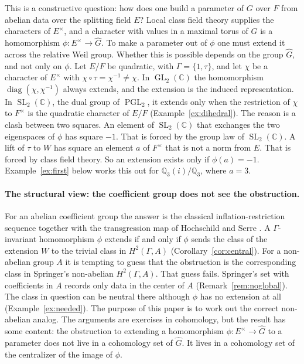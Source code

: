 \documentclass[12pt,letterpaper]{article}
\numberwithin{equation}{section}
\theoremstyle{plain}
\theoremstyle{definition}
\newcommand{\C}{\mathbb{C}}
\newcommand{\Q}{\mathbb{Q}}
\newcommand{\Gh}{\widehat{G}}
\DeclareMathOperator{\GL}{GL}
\DeclareMathOperator{\SL}{SL}
\DeclareMathOperator{\PGL}{PGL}
\DeclareMathOperator{\diag}{diag}
\begin{document}
This is a constructive question: how does one build a parameter of $G$
over $F$ from abelian data over the splitting field $E$? Local class
field theory supplies the characters of $E^\times$, and a character with
values in a maximal torus of $\Gh$ is a homomorphism
$\phi:E^\times\to\Gh$. To make a parameter out of $\phi$ one must extend
it across the relative Weil group. Whether this is possible depends on
the group $\Gh$, and not only on $\phi$. Let $E/F$ be quadratic, with
$\Gamma=\{1,\tau\}$, and let $\chi$ be a character of $E^\times$ with
$\chi\circ\tau=\chi^{-1}\neq\chi$. In $\GL_2(\C)$ the homomorphism
$\diag(\chi,\chi^{-1})$ always extends, and the extension is the induced
representation. In $\SL_2(\C)$, the dual group of $\PGL_2$, it extends
only when the restriction of $\chi$ to $F^\times$ is the quadratic
character of $E/F$ (Example~\ref{ex:dihedral}). The reason is a clash
between two squares. An element of $\SL_2(\C)$ that exchanges the two
eigenspaces of $\phi$ has square $-1$. That is forced by the group law
of $\SL_2(\C)$. A lift of $\tau$ to $W$ has square an element $a$ of
$F^\times$ that is not a norm from $E$. That is forced by class field
theory. So an extension exists only if $\phi(a)=-1$.
Example~\ref{ex:first} below works this out for $\Q_3(i)/\Q_3$, where
$a=3$.

\paragraph{The structural view: the coefficient group does not see the
obstruction.}
For an abelian coefficient group the answer is the classical
inflation-restriction sequence \cite[Ch.~VII, \S6]{Se79} together with the
transgression map of Hochschild and Serre \cite{HS53}. A
$\Gamma$-invariant homomorphism $\phi$ extends if and only if $\phi$
sends the class of the extension $W$ to the trivial class in
$H^2(\Gamma,A)$ (Corollary~\ref{cor:central}). For a non-abelian group
$A$ it is tempting to guess that the obstruction is the corresponding
class in Springer's non-abelian $H^2(\Gamma,A)$. That guess fails.
Springer's set with coefficients in $A$ records only data in the center
of $A$ (Remark~\ref{rem:noglobal}). The class in question can be neutral
there although $\phi$ has no extension at all
(Example~\ref{ex:needed}). The purpose of this paper is to work out the
correct non-abelian analog. The arguments are exercises in cohomology,
but the result has some content: the obstruction to extending a
homomorphism $\phi:E^\times\to\Gh$ to a parameter does not live in a
cohomology set of $\Gh$. It lives in a cohomology set of the centralizer
of the image of $\phi$.
\end{document}
